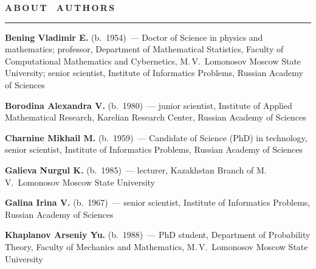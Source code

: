 \def\stat{authors}
{%
\raggedleft\Large \bf%
A\,B\,O\,U\,T\  \  A\,U\,T\,H\,O\,R\,S \vskip 17pt
    \hrule
    \par
{} }

\label{st\stat}


\def\leftkol{\ } %
\def\rightkol{ABOUT AUTHORS} %


\vspace*{36pt}

\begin{multicols}{2}


 
\noindent
\textbf{Bening Vladimir E.} (b.\ 1954)~--- Doctor of Science in physics and mathematics; 
professor, Department of Mathematical Statistics, Faculty of Computational Mathematics and 
Cybernetics, M.\,V.~Lomonosov Moscow State University; senior scientist, 
Institute of Informatics Problems, Russian Academy of Sciences 

\vspace*{4pt}

\noindent
\textbf{Borodina Alexandra V.} (b.\ 1980)~--- junior scientist, Institute 
of Applied Mathematical Research, Karelian Research Center, Russian Academy of Sciences 

\vspace*{4pt}

\noindent
\textbf{Charnine Mikhail M.} (b.\ 1959)~--- Candidate of Science (PhD) in technology, 
senior scientist, Institute of Informatics Problems, Russian Academy of Sciences 

\vspace*{4pt}

\noindent
\textbf{Galieva Nurgul K.} (b.\ 1985)~--- lecturer, Kazakhstan Branch of M.\,V.~Lomonosov 
Moscow State University

\vspace*{4pt}

\noindent
\textbf{Galina Irina V.} (b.\ 1967)~--- senior scientist, Institute of Informatics Problems, 
Russian Academy of Sciences

\vspace*{4pt}

\noindent
\textbf{Khaplanov Arseniy Yu.} (b.\ 1988)~--- PhD student, Department of Probability Theory, 
Faculty of Mechanics and Mathematics, M.\,V.~Lomonosov Moscow State University

\vspace*{4pt}


\end{multicols}
